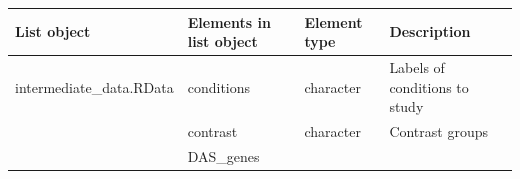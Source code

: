 \documentclass[]{article}
\begin{document}
\begin{longtable}[]{@{}llll@{}}
\toprule
\begin{minipage}[b]{0.08\columnwidth}\raggedright\strut
List object\strut
\end{minipage} & \begin{minipage}[b]{0.06\columnwidth}\raggedright\strut
Elements in list object\strut
\end{minipage} & \begin{minipage}[b]{0.04\columnwidth}\raggedright\strut
Element type\strut
\end{minipage} & \begin{minipage}[b]{0.71\columnwidth}\raggedright\strut
Description\strut
\end{minipage}\tabularnewline
\midrule
\endhead
\begin{minipage}[t]{0.08\columnwidth}\raggedright\strut
intermediate\_data.RData\strut
\end{minipage} & \begin{minipage}[t]{0.06\columnwidth}\raggedright\strut
conditions\strut
\end{minipage} & \begin{minipage}[t]{0.04\columnwidth}\raggedright\strut
character\strut
\end{minipage} & \begin{minipage}[t]{0.71\columnwidth}\raggedright\strut
Labels of conditions to study\strut
\end{minipage}\tabularnewline
\begin{minipage}[t]{0.08\columnwidth}\raggedright\strut
\strut
\end{minipage} & \begin{minipage}[t]{0.06\columnwidth}\raggedright\strut
contrast\strut
\end{minipage} & \begin{minipage}[t]{0.04\columnwidth}\raggedright\strut
character\strut
\end{minipage} & \begin{minipage}[t]{0.71\columnwidth}\raggedright\strut
Contrast groups\strut
\end{minipage}\tabularnewline
\begin{minipage}[t]{0.08\columnwidth}\raggedright\strut
\strut
\end{minipage} & \begin{minipage}[t]{0.06\columnwidth}\raggedright\strut
DAS\_genes\strut
\end{minipage} & \begin{minipage}[t]{0.04\columnwidth}\raggedright\strut

\end{minipage}
\end{longtable}
\end{document}
